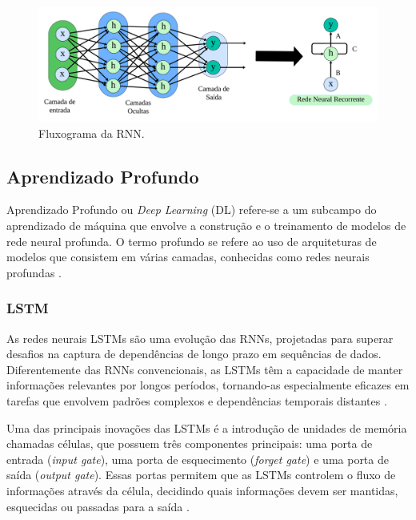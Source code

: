 \begin{figure}[!htb]
 	\centering
 	\caption{Fluxograma da RNN.}
 	\label{fig:rnn1}
 	\includegraphics[width=\linewidth]{Modelos/Figuras/rnn1.pdf}
 
 \end{figure}
 
  \subsection{Aprendizado Profundo}

 Aprendizado Profundo ou \textit{Deep Learning} (DL) refere-se a um subcampo do aprendizado de máquina que envolve a construção e o treinamento de modelos de rede neural profunda. O termo profundo se refere ao uso de arquiteturas de modelos que consistem em várias camadas, conhecidas como redes neurais profundas \cite{KOTHONA2023101149}.
 

 
 \subsubsection{LSTM}
 
 As redes neurais LSTMs são uma evolução das RNNs, projetadas para superar desafios na captura de dependências de longo prazo em sequências de dados. Diferentemente das RNNs convencionais, as LSTMs têm a capacidade de manter informações relevantes por longos períodos, tornando-as especialmente eficazes em tarefas que envolvem padrões complexos e dependências temporais distantes \cite{Zhang2021}.
 
 Uma das principais inovações das LSTMs é a introdução de unidades de memória chamadas células, que possuem três componentes principais: uma porta de entrada (\textit{input gate}), uma porta de esquecimento (\textit{forget gate}) e uma porta de saída (\textit{output gate}). Essas portas permitem que as LSTMs controlem o fluxo de informações através da célula, decidindo quais informações devem ser mantidas, esquecidas ou passadas para a saída \cite{Zhang2021}.
  
